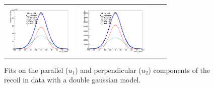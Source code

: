 \begin{figure}[!ht]
\begin{tabular}{cccc}
  \includegraphics[width=100pt]{figuresARC/recoil/FITS/Data/pfu2fit_2.png} &
  \includegraphics[width=100pt]{figuresARC/recoil/FITS/Data/pfu2fit_3.png} \\
\end{tabular}
\caption{Fits on the parallel ($u_{1}$) and perpendicular ($u_{2}$) components of the recoil in data with a double gaussian model.}
\label{fig:METrecoil3}
\end{figure}

